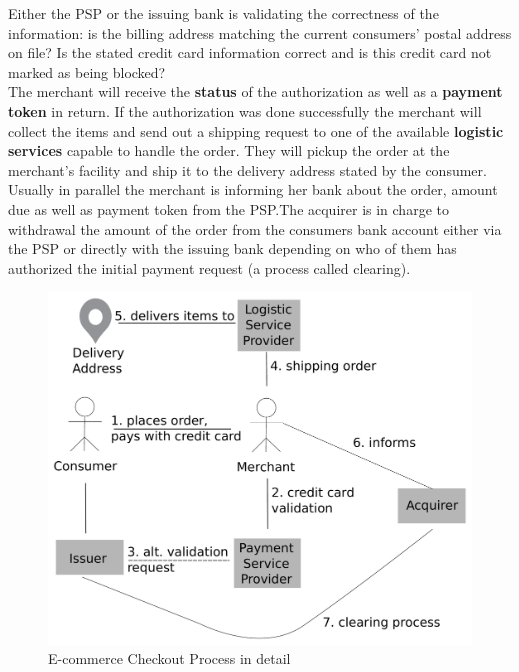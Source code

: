 Either the PSP or the issuing bank is validating the correctness of the information: is the billing address matching the current consumers' postal address on file? Is the stated credit card information correct and is this credit card not marked as being blocked? \\
The merchant will receive the \textbf{status} of the authorization as well as a \textbf{payment token} in return. If the authorization was done successfully the merchant will collect the items and send out a shipping request to one of the available \textbf{logistic services} capable to handle the order. They will pickup the order at the merchant's facility and ship it to the delivery address stated by the consumer. Usually in parallel the merchant is informing her bank about the order, amount due as well as payment token from the PSP.\@ The acquirer is in charge to withdrawal the amount of the order from the consumers bank account either via the PSP or directly with the issuing bank depending on who of them has authorized the initial payment request (a process called clearing).\@

\begin{figure}[H]
	\centering
		\includegraphics[width=0.8\columnwidth]{images/e-commerce-checkout-process.pdf}
	\caption{E-commerce Checkout Process in detail}
\label{fig:images_ecommerce_checkout_process}
\end{figure}

